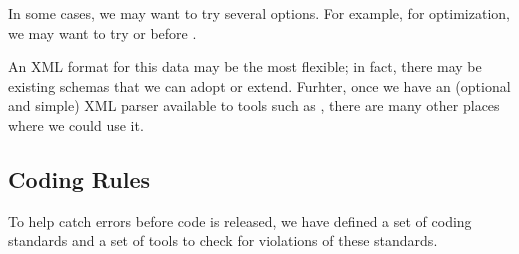 \documentclass{article}
\begin{document}
In some cases, we may want to try several options.  For example, for
optimization, we may want to try  or  before .



An XML format for this data may be the most flexible; in fact, there
may be existing schemas that we can adopt or extend.  Furhter, once we
have an (optional and simple) XML parser available to tools such as
, there are many other places where we could use it.


\subsection{Coding Rules}
To help catch errors before code is released, we have defined a set of
coding standards
and a set of tools to check for violations of these standards.
\end{document}
